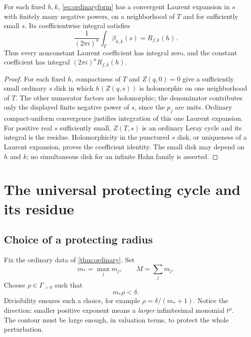 \documentclass[11pt,letterpaper]{article}
\theoremstyle{definition}
\theoremstyle{remark}
\numberwithin{equation}{section}
\begin{document}
\begin{lemma}\label{lem:constant}
For each fixed $h,k$, \eqref{eq:ordinaryform} has a convergent Laurent
expansion in $s$ with finitely many negative powers, on a neighborhood of $T$
and for sufficiently small $s$. Its coefficientwise integral satisfies
\begin{equation}\label{eq:constantperiod}
 \frac{1}{(2\pi i)^n}\int_T\beta_{h,k}(s)=R_{f,k}(h).
\end{equation}
Thus every nonconstant Laurent coefficient has integral zero, and the constant
coefficient has integral $(2\pi i)^nR_{f,k}(h)$.
\end{lemma}
\begin{proof}
For each fixed $h$, compactness of $T$ and $Z(q,0)=0$ give a sufficiently small
ordinary $s$ disk in which $h(Z(q,s))$ is holomorphic on one neighborhood of
$T$. The other numerator factors are holomorphic; the denominator contributes
only the displayed finite negative power of $s$, since the $p_j$ are units.
Ordinary compact-uniform convergence justifies integration of this one Laurent
expansion. For positive real $s$ sufficiently small, $Z(T,s)$ is an ordinary
Leray cycle and its integral is the residue. Holomorphicity in the punctured
$s$ disk, or uniqueness of a Laurent expansion, proves the coefficient
identity. The small disk may depend on $h$ and $k$; no simultaneous disk for
an infinite Hahn family is asserted.
\end{proof}

\section{The universal protecting cycle and its residue}
\label{sec:universal}

\subsection{Choice of a protecting radius}
Fix the ordinary data of \cref{thm:ordinary}. Set
\[
 m_* =\max_jm_j,\qquad M=\sum_jm_j.
\]
Choose $\rho\in\Gamma_{>0}$ such that
\begin{equation}\label{eq:protect}
 m_*\rho<\delta.
\end{equation}
Divisibility ensures such a choice, for example
$\rho=\delta/(m_*+1)$. Notice the direction: smaller positive exponent means
a \emph{larger} infinitesimal monomial $t^\rho$. The contour must be large
enough, in valuation terms, to protect the whole perturbation.
\end{document}
